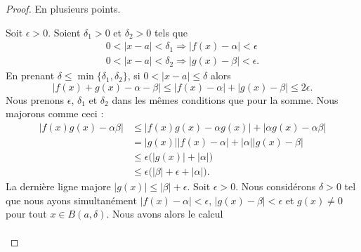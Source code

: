 \begin{proof}
    En plusieurs points.
    \begin{subproof}
        \spitem[La somme]
        Soit \( \epsilon>0\). Soient \( \delta_1>0\) et \( \delta_2>0\) tels que 
        \begin{subequations}
            \begin{align}
                0<| x-a |<\delta_1\Rightarrow | f(x)-\alpha |<\epsilon\\
                0<| x-a |<\delta_2\Rightarrow | g(x)-\beta |<\epsilon.
            \end{align}
        \end{subequations}
        En prenant \( \delta\leq \min\{ \delta_1,\delta_2 \}\), si \( 0<| x-a |\leq \delta\) alors
        \begin{equation}
            | f(x)+g(x)-\alpha-\beta |\leq | f(x)-\alpha |+| g(x)-\beta |\leq 2\epsilon.
        \end{equation}
        \spitem[Le produit]
        Nous prenons \( \epsilon\), \( \delta_1\) et \( \delta_2\) dans les mêmes conditions que pour la somme. Nous majorons comme ceci :
        \begin{subequations}
            \begin{align}
                | f(x)g(x)-\alpha\beta |&\leq | f(x)g(x)-\alpha g(x) |+| \alpha g(x)-\alpha\beta |\\
                &=| g(x) | |f(x)-\alpha |+| \alpha | |g(x)-\beta |\\
                &\leq   \epsilon\big(  | g(x) |  +| \alpha |   \big)\\
                &\leq \epsilon\big( | \beta |+\epsilon+| \alpha | \big).
            \end{align}
        \end{subequations}
        La dernière ligne majore \( | g(x) |\leq | \beta |+\epsilon\).
        \spitem[Le quotient]
        Soit \( \epsilon>0\). Nous considérons \( \delta>0\) tel que nous ayons simultanément \( | f(x)-\alpha |<\epsilon\), \( | g(x)-\beta |<\epsilon\) et \( g(x)\neq 0\) pour tout \( x\in B(a,\delta)\). Nous avons alors le calcul
        \begin{subequations}
            \begin{align}

\end{align}
\end{subequations}
\end{subproof}
\end{proof}
